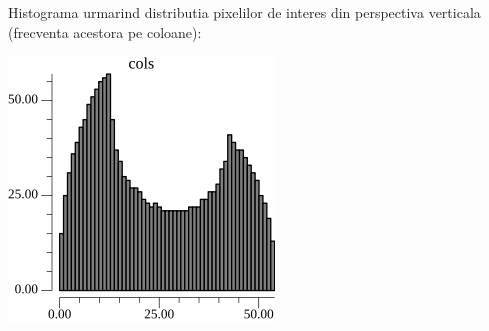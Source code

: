 \documentclass[10pt]{article}
\begin{document}
\> Histograma urmarind distributia pixelilor de interes din perspectiva verticala (frecventa acestora pe coloane):

\begin{center}

  \includegraphics[scale=0.5]{hist-cols}
  
\end{center}

\newpage
\end{document}
